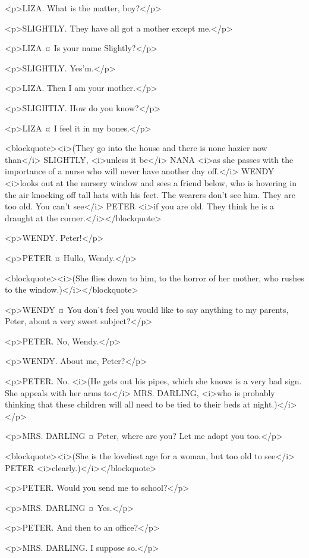 <p>LIZA. What is the matter, boy?</p>

<p>SLIGHTLY. They have all got a mother except me.</p>

<p>LIZA ¤
Is your name Slightly?</p>

<p>SLIGHTLY. Yes'm.</p>

<p>LIZA. Then I am your mother.</p>

<p>SLIGHTLY. How do you know?</p>

<p>LIZA ¤
I feel it in my bones.</p>

<blockquote><i>(They go into the house and there is none hazier now than</i> SLIGHTLY, <i>unless it be</i> NANA <i>as she passes with the importance of a nurse who will never have another day off.</i> WENDY <i>looks out at the nursery window and sees a friend below, who is hovering in the air knocking off tall hats with his feet. The wearers don't see him. They are too old. You can't see</i> PETER <i>if you are old. They think he is a draught at the corner.</i></blockquote>

<p>WENDY. Peter!</p>

<p>PETER ¤
Hullo, Wendy.</p>

<blockquote><i>(She flies down to him, to the horror of her mother, who rushes to the window.)</i></blockquote>

<p>WENDY ¤
You don't feel you would like to say anything to my parents, Peter, about a very sweet subject?</p>

<p>PETER. No, Wendy.</p>

<p>WENDY. About me, Peter?</p>

<p>PETER. No. <i>(He gets out his pipes, which she knows is a very bad sign. She appeals with her arms to</i> MRS. DARLING, <i>who is probably thinking that these children will all need to be tied to their beds at night.)</i></p>

<p>MRS. DARLING ¤
Peter, where are you? Let me adopt you too.</p>

<blockquote><i>(She is the loveliest age for a woman, but too old to see</i> PETER <i>clearly.)</i></blockquote>

<p>PETER. Would you send me to school?</p>

<p>MRS. DARLING ¤
Yes.</p>

<p>PETER. And then to an office?</p>

<p>MRS. DARLING. I suppose so.</p>

